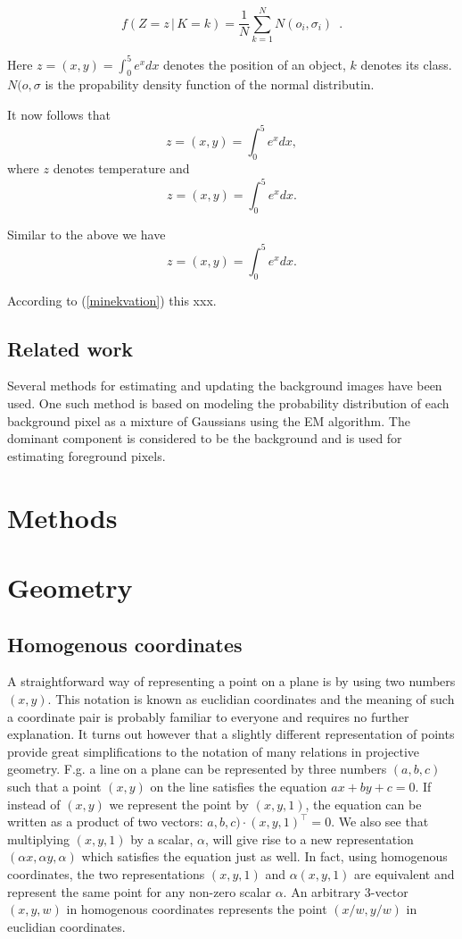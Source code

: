 \documentclass[a4paper]{article}
\begin{document}
$$ f(Z=z \, | \, K = k) = \frac{1}{N} \sum_{k=1}^N N(o_i,\sigma_i)
\enspace .$$

Here $z = (x,y) = \int_0^5 e^x dx$ denotes the position of an object, $k$ denotes its
class. $N(o,\sigma$ is the propability density function of the normal
distributin.

It now follows that
$$z = (x,y) = \int_0^5 e^x dx, $$
where $z$ denotes temperature and
$$z = (x,y) = \int_0^5 e^x dx. $$

Similar to the above we have
\begin{equation}
  z = (x,y) = \int_0^5 e^x dx .
  \label{minekvation}
  \end{equation}

According to  (\ref{minekvation}) this xxx.

\subsection{Related work}

Several methods for estimating and updating the background images have
been used.  One such method \cite{stauffer-ccvpr-99} is based on
modeling the probability distribution of each background pixel as a
mixture of Gaussians using the EM algorithm.  The dominant component
is considered to be the background and is used for estimating
foreground pixels.

\section{Methods}

\section{Geometry}

\subsection{Homogenous coordinates}
A straightforward way of representing a point on a plane is by
using two numbers \((x,y)\). This notation is known as euclidian
coordinates and the meaning of such a coordinate pair is probably
familiar to everyone and requires no further explanation. It turns
out however that a slightly different representation of points
provide great simplifications to the notation of many relations in
projective geometry. F.g. a line on a plane can be represented by
three numbers \((a,b,c)\) such that a point \((x,y)\) on the line
satisfies the equation \(ax+by+c=0\). If instead of \((x,y)\) we
represent the point by \((x,y,1)\), the equation can be written as
a product of two vectors: \(a,b,c)\cdot(x,y,1)^{\top}=0\). We also
see that multiplying \((x,y,1)\) by a scalar, \(\alpha\), will
give rise to a new representation \((\alpha x,\alpha y,\alpha)\)
which satisfies the equation just as well. In fact, using
homogenous coordinates, the two representations \((x,y,1)\) and
\(\alpha(x,y,1)\) are equivalent and represent the same point for
any non-zero scalar \(\alpha\). An arbitrary 3-vector \((x,y,w)\)
in homogenous coordinates represents the point \((x / w,y / w)\)
in euclidian coordinates.
\end{document}
